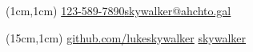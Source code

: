 \documentclass[11pt,a4paper]{moderncv}
\begin{document}
	\makecvtitle
	
	\begin{textblock*}{3cm}(1cm,1cm) %
		{\small {} \enspace \enspace \href{tel:123-589-7890}{123-589-7890}\newline \faEnvelope[regular] \enspace \href{mailto:skywalker@ahchto.gal}{skywalker@ahchto.gal}}
	\end{textblock*}
	
	\begin{textblock*}{3cm}(15cm,1cm) %
		{ \small \faGithub \enspace \color{blue} \href{https://github.com/harryjackson}{github.com/lukeskywalker}
			\faLinkedin \enspace \color{blue}\href{https://www.linkedin.com/in/jacksonharry/}{skywalker}
		}
	\end{textblock*}
	
\end{document}
